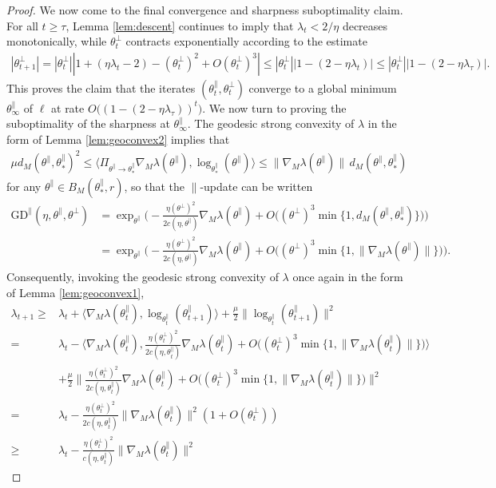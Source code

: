 \documentclass{article}
\newcommand{\tpa}{\theta^{\parallel}}
\newcommand{\tpe}{\theta^{\perp}}
\newcommand{\GD}{\mathrm{GD}}
\theoremstyle{plain}
\theoremstyle{definition}
\theoremstyle{remark}
\begin{document}
\begin{proof}
    We now come to the final convergence and sharpness suboptimality claim. For all $t\geq \tau$, Lemma \ref{lem:descent} continues to imply that $\lambda_t<2/\eta$ decreases monotonically, while $\tpe_t$ contracts exponentially according to the estimate
    \begin{align}
        |\tpe_{t+1}| = |\tpe_t||1+(\eta\lambda_t-2)-(\tpe_t)^2+O(\tpe_t)^3|\leq |\tpe_t||1-(2-\eta\lambda_t)|\leq |\tpe_t||1-(2-\eta\lambda_{\tau})|.
    \end{align}
    This proves the claim that the iterates $(\tpa_t,\tpe_t)$ converge to a global minimum $\tpa_{\infty}$ of $\ell$ at rate $O\big((1-(2-\eta\lambda_{\tau}))^t\big)$. We now turn to proving the suboptimality of the sharpness at $\tpa_{\infty}$. The geodesic strong convexity of $\lambda$ in the form of Lemma \ref{lem:geoconvex2} implies that
    \begin{align}
        \mu d_M(\tpa,\tpa_*)^2\leq \langle\Pi_{\tpa\rightarrow\tpa_*}\nabla_M\lambda(\tpa),\log_{\tpa_*}(\tpa)\rangle\leq \|\nabla_M\lambda(\tpa)\|\,d_M(\tpa,\tpa_*)
    \end{align}
    for any $\tpa\in B_M(\tpa_*,r)$, so that the $\parallel$-update can be written
    \begin{align}
        \GD^{\parallel}(\eta,\tpa,\tpe) &= \exp_{\tpa}\bigg(-\frac{\eta(\tpe)^2}{2c(\eta,\tpa)}\nabla_M\lambda(\tpa) + O\big((\tpe)^3\min\{1,d_M(\tpa,\tpa_*)\}\big)\bigg)\\&=\exp_{\tpa}\bigg(-\frac{\eta(\tpe)^2}{2c(\eta,\tpa)}\nabla_M\lambda(\tpa)+O\big((\tpe)^3\min\{1,\|\nabla_M\lambda(\tpa)\|\}\big)\bigg).
    \end{align}
    Consequently, invoking the geodesic strong convexity of $\lambda$ once again in the form of Lemma \ref{lem:geoconvex1},
    \begin{align}
        \lambda_{t+1}\geq& \lambda_t+\langle \nabla_M\lambda(\tpa_t),\log_{\tpa_t}(\tpa_{t+1})\rangle+\frac{\mu}{2}\|\log_{\tpa_t}(\tpa_{t+1})\|^2\\=&\lambda_t-\bigg\langle\nabla_M\lambda(\tpa_t),\frac{\eta(\tpe_t)^2}{2c(\eta,\tpa_t)}\nabla_M\lambda(\tpa_t)+O\big((\tpe_t)^3\min\{1,\|\nabla_M\lambda(\tpa_t)\|\}\big)\bigg\rangle\\& +\frac{\mu}{2}\bigg\|\frac{\eta(\tpe_t)^2}{2c(\eta,\tpa_t)}\nabla_M\lambda(\tpa_t)+O\big((\tpe_t)^3\min\{1,\|\nabla_M\lambda(\tpa_t)\|\}\big)\bigg\|^2\\=&\lambda_t-\frac{\eta(\tpe_t)^2}{2c(\eta,\tpa_t)}\|\nabla_M\lambda(\tpa_t)\|^2(1 + O(\tpe_t))\\\geq& \lambda_t-\frac{\eta(\tpe_t)^2}{c(\eta,\tpa_t)}\|\nabla_M\lambda(\tpa_t)\|^2

\end{align}
\end{proof}
\end{document}
